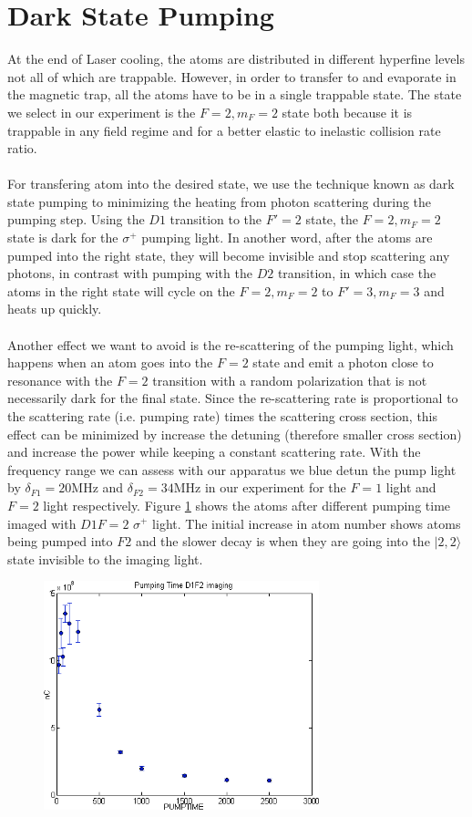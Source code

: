 \section{Dark State Pumping}\label{exp:pump}
At the end of Laser cooling, the atoms are distributed in different hyperfine levels not all of which are trappable. However, in order to transfer to and evaporate in the magnetic trap, all the atoms have to be in a single trappable state. The state we select in our experiment is the $F=2, m_F=2$ state both because it is trappable in any field regime and for a better elastic to inelastic collision rate ratio.\\
\\
For transfering atom into the desired state, we use the technique known as dark state pumping to minimizing the heating from photon scattering during the pumping step. Using the $D1$ transition to the $F'=2$ state, the $F=2, m_F=2$ state is dark for the $\sigma^+$ pumping light. In another word, after the atoms are pumped into the right state, they will become invisible and stop scattering any photons, in contrast with pumping with the $D2$ transition, in which case the atoms in the right state will cycle on the $F=2, m_F=2$ to $F'=3, m_F=3$ and heats up quickly.\\
\\
Another effect we want to avoid is the re-scattering of the pumping light, which happens when an atom goes into the $F=2$ state and emit a photon close to resonance with the $F=2$ transition with a random polarization that is not necessarily dark for the final state. Since the re-scattering rate is proportional to the scattering rate (i.e. pumping rate) times the scattering cross section, this effect can be minimized by increase the detuning (therefore smaller cross section) and increase the power while keeping a constant scattering rate. With the frequency range we can assess with our apparatus we blue detun the pump light by $\delta_{F1}=20\text{MHz}$ and $\delta_{F2}=34\text{MHz}$ in our experiment for the $F=1$ light and $F=2$ light respectively. Figure \ref{exp:mf-pump-time} shows the atoms after different pumping time imaged with $D1 F=2$ $\sigma^+$ light. The initial increase in atom number shows atoms being pumped into $F2$ and the slower decay is when they are going into the $|2, 2\rangle$ state invisible to the imaging light.
\begin{figure}
  \begin{center}
    \includegraphics[width=8cm]{mf-pump.png}
  \end{center}
  \caption{}
  \label{exp:mf-pump-time}
\end{figure}

